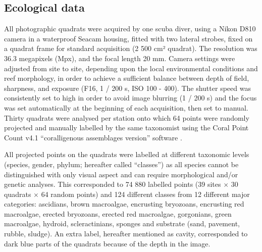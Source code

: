 \subsection{Ecological data}\label{chapitre4_2.3}
All photographic quadrats were acquired by one scuba diver, using a Nikon D810 camera in a waterproof Seacam housing, fitted with two lateral strobes, fixed on a quadrat frame for standard acquisition (2 500 cm² quadrat). The resolution was 36.3 megapixels (Mpx), and the focal length 20 mm. Camera settings were adjusted from site to site, depending upon the local environmental conditions and reef morphology, in order to achieve a sufficient balance between depth of field, sharpness, and exposure (F16, 1 / 200 s, ISO 100 - 400). The shutter speed was consistently set to high in order to avoid image blurring (1 / 200 s) and the focus was set automatically at the beginning of each acquisition, then set to manual. Thirty quadrats were analysed per station onto which 64 points were randomly projected and manually labelled by the same taxonomist using the Coral Point Count v4.1 “coralligenous assemblages version” \citep{cpce_coral_2011} software \citep{deter_rapid_2012}.

All projected points on the quadrats were labelled at different taxonomic levels (species, gender, phylum; hereafter called “classes”) as all species cannot be distinguished with only visual aspect and can require morphological and/or genetic analyses. This corresponded to 74 880 labelled points (39 sites $\times$ 30 quadrats $\times$ 64 random points) and 124 different classes from 12 different major categories: ascidians, brown macroalgae, encrusting bryozoans, encrusting red macroalgae, erected bryozoans, erected red macroalgae, gorgonians, green macroalgae, hydroid, scleractinians, sponges and substrate (sand, pavement, rubble, sludge). An extra label, hereafter mentioned as cavity, corresponded to dark blue parts of the quadrats because of the depth in the image. 

